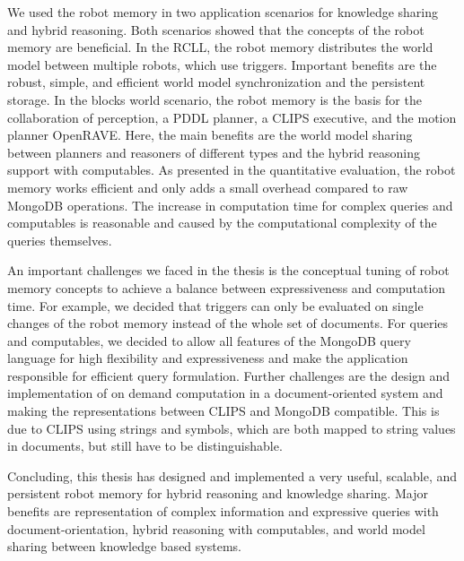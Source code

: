 We used the robot memory in two application scenarios for knowledge
sharing and hybrid reasoning. Both scenarios showed that the concepts
of the robot memory are beneficial. In the RCLL, the robot memory
distributes the world model between multiple robots, which use
triggers. Important benefits are the robust, simple, and efficient
world model synchronization and the persistent storage. In the blocks
world scenario, the robot memory is the basis for the collaboration of
perception, a PDDL planner, a CLIPS executive, and the motion planner
OpenRAVE. Here, the main benefits are the world model sharing between
planners and reasoners of different types and the hybrid reasoning
support with computables.  As presented in the quantitative
evaluation, the robot memory works efficient and only adds a small
overhead compared to raw MongoDB operations. The increase in
computation time for complex queries and computables is reasonable and
caused by the computational complexity of the queries themselves.

An important challenges we faced in the thesis is the conceptual
tuning of robot memory concepts to achieve a balance between
expressiveness and computation time. For example, we decided that
triggers can only be evaluated on single changes of the robot memory
instead of the whole set of documents. For queries and computables, we
decided to allow all features of the MongoDB query language for high
flexibility and expressiveness and make the application responsible
for efficient query formulation.  Further challenges are the design
and implementation of on demand computation in a document-oriented
system and making the representations between CLIPS and MongoDB
compatible. This is due to CLIPS using strings and symbols, which are
both mapped to string values in documents, but still have to be
distinguishable.

Concluding, this thesis has designed and implemented a very useful,
scalable, and persistent robot memory for hybrid reasoning and
knowledge sharing. Major benefits are representation of
complex information and expressive queries with document-orientation,
hybrid reasoning with computables, and world model sharing between
knowledge based systems.

